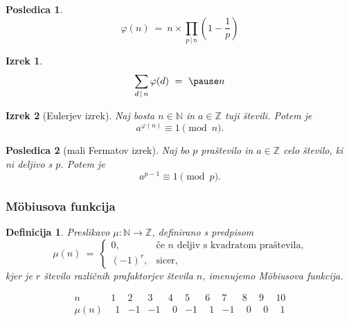 \documentclass{beamer}
\def\N{\mathbb{N}} %
\def\Z{\mathbb{Z}} %
\newtheorem{izrek}{Izrek}
\newtheorem{posledica}{Posledica}
\newtheorem{definicija}{Definicija}
\begin{document}

\begin{frame}

\begin{posledica}
\[
\varphi(n)\ =\ n\times \prod_{p\,|\,n} \left(1 - \frac{1}{p}\right)
\]
\end{posledica}

\bigskip
\pause
\begin{izrek}
\[
\sum_{d\,|\,n} \varphi(d)\ =\ \pause n
\]
\end{izrek}


\end{frame}


\begin{frame}
\begin{izrek}[Eulerjev izrek]
Naj bosta $n \in \N$ in $a \in \Z$ tuji števili. Potem je
\[
a^{\varphi(n)} \equiv 1 \pmod{n}.
\]
\end{izrek}

\pause

\bigskip
\begin{posledica}[mali Fermatov izrek]
Naj bo $p$ praštevilo in $a \in \Z$ celo število, ki ni deljivo s $p$. Potem je
\[
a^{p-1} \equiv 1 \pmod{p}.
\]
\end{posledica}


\end{frame}


\begin{frame}
\frametitle{M\"obiusova funkcija}

\pause
\begin{definicija}
Preslikavo \alert{$\mu: \N \rightarrow \Z$}, definirano s predpisom
\[
\mu(n)\ =\ \left\{
\begin{array}{cl}
0, & \mbox{če\ } n \mbox{\ deljiv s kvadratom praštevila,} \\
(-1)^r, & \mbox{sicer,}
\end{array}
\right.
\]
kjer je $r$ število različnih prafaktorjev števila $n$, imenujemo \em{M\"obiusova funkcija}.
\end{definicija}

\pause
\[
\begin{array}{c|*{10}{r}}
   n   & 1 & 2 & 3 & 4 & 5 & 6 & 7 & 8 & 9 & 10 \\
\hline
\mu(n) & \ \ 1 & -1 & -1 & \ \ 0 & -1 & \ \ 1 & -1 & \ \ 0 & \ \ 0 & \ \ 1
\end{array}
\]
\end{frame}
\end{document}
